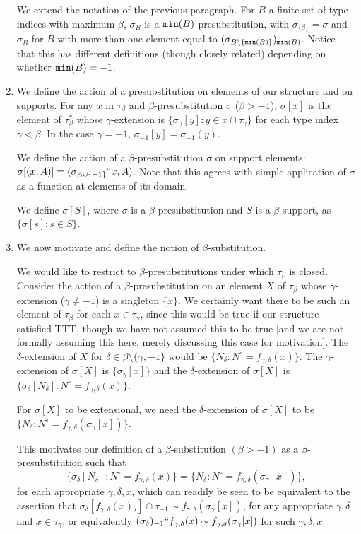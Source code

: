 \documentclass[12pt]{article}
\begin{document}
\begin{enumerate}
We extend the notation of the previous paragraph.   For $B$ a finite set of type indices with maximum $\beta$, $\sigma_B$ is a ${\tt min}(B)$-presubstitution, with $\sigma_{\{\beta\}} = \sigma$ and $\sigma_B$ for $B$ with more than one element
equal to $(\sigma_{B \setminus \{{\tt min}(B)\}})_{{\tt min}(B)}$.  Notice that this has different definitions (though closely related) depending on whether ${\tt min}(B)=-1$.

\item  We define the action of a presubstitution on elements of our structure and on supports.  For any $x$ in $\tau_\beta$ and $\beta$-presubstitution $\sigma$ ($\beta>-1$), $\sigma[x]$ is the element of $\tau^*_\beta$ whose $\gamma$-extension is $\{\sigma_\gamma[y]:y \in x \cap \tau_\gamma\}$ for each type index $\gamma<\beta$.  In
the case $\gamma=-1$, $\sigma_{-1}[y] = \sigma_{-1}(y)$.

We define the action of a $\beta$-presubstitution $\sigma$ on support elements:  $\sigma[(x,A)] = (\sigma_{A \cup \{-1\}}``x,A)$.  Note that this agrees with simple application
of $\sigma$ as a function at elements of  its domain.

We define $\sigma[S]$, where $\sigma$ is a $\beta$-presubstitution and $S$ is a $\beta$-support, as $\{\sigma[s]:s \in S\}$.

\item  We now motivate and define the notion of $\beta$-substitution.

We would like to restrict to $\beta$-presubstitutions under which $\tau_\beta$ is closed.  Consider the action of a $\beta$-presubstitution on an element $X$ of $\tau_\beta$ whose $\gamma$-extension ($\gamma \neq -1$) is a singleton $\{x\}$.  We certainly want there to be such an element of $\tau_\beta$
for each $x \in \tau_\gamma$, since this would be true if our structure satisfied TTT, though we have not assumed this to be true [and we are not formally assuming this here, merely discussing this case for motivation].  The $\delta$-extension of $X$ for $\delta \in \beta \setminus \{\gamma,-1\}$ would be $\{N_\delta:N^\circ = f_{\gamma,\delta}(x)\}$.
The $\gamma$-extension of $\sigma[X]$ is $\{\sigma_\gamma[x]\}$ and the $\delta$-extension of $\sigma[X]$ is $\{\sigma_\delta[N_\delta]:N^\circ = f_{\gamma,\delta}(x)\}$.  

For $\sigma[X]$ to be extensional, we need the $\delta$-extension of $\sigma[X]$ to be $\{N_\delta:N^\circ = f_{\gamma,\delta}(\sigma_\gamma[x])\}$.

This motivates our definition of a $\beta$-substitution $(\beta>-1)$ as a $\beta$-presubstitution such that $$\{\sigma_\delta[N_\delta]:N^\circ = f_{\gamma,\delta}(x)\} = \{N_\delta:N^\circ = f_{\gamma,\delta}(\sigma_\gamma[x])\},$$ for each appropriate $\gamma, \delta,x$, which can readily be seen to be equivalent to the assertion that
$\sigma_\delta[f_{\gamma,\delta}(x)_\delta] \cap \tau_{-1} \sim  f_{\gamma,\delta}(\sigma_\gamma[x])$, for any appropriate $\gamma, \delta$ and $x \in \tau_\gamma$, or equivalently
$(\sigma_\delta)_{-1}``f_{\gamma,\delta}(x) \sim f_{\gamma,\delta}(\sigma_\gamma[x])$ for such $\gamma,\delta,x$.


\end{enumerate}
\end{document}

